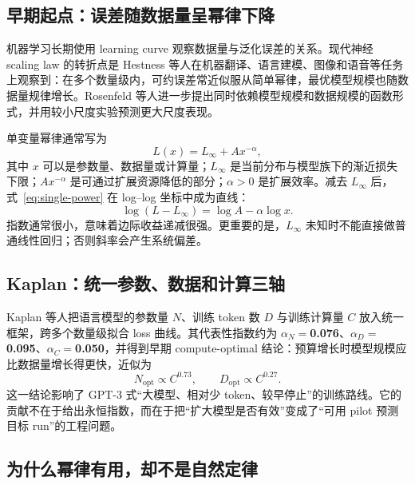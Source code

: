 \documentclass[UTF8,10pt,a4paper,fontset=none]{ctexart}
\begin{document}
\subsection{早期起点：误差随数据量呈幂律下降}

机器学习长期使用 learning curve 观察数据量与泛化误差的关系。现代神经 scaling law 的转折点是 Hestness 等人在机器翻译、语言建模、图像和语音等任务上观察到：在多个数量级内，可约误差常近似服从简单幂律，最优模型规模也随数据量规律增长\cite{hestness2017}。Rosenfeld 等人进一步提出同时依赖模型规模和数据规模的函数形式，并用较小尺度实验预测更大尺度表现\cite{rosenfeld2019}。

单变量幂律通常写为
\begin{equation}
  L(x)=L_{\infty}+A x^{-\alpha},
  \label{eq:single-power}
\end{equation}
其中 $x$ 可以是参数量、数据量或计算量；$L_{\infty}$ 是当前分布与模型族下的渐近损失下限；$A x^{-\alpha}$ 是可通过扩展资源降低的部分；$\alpha>0$ 是扩展效率。减去 $L_{\infty}$ 后，式~\eqref{eq:single-power} 在 log--log 坐标中成为直线：
\begin{equation}
  \log\!\left(L-L_{\infty}\right)=\log A-\alpha\log x.
  \label{eq:loglinear}
\end{equation}
指数通常很小，意味着边际收益递减很强。更重要的是，$L_{\infty}$ 未知时不能直接做普通线性回归；否则斜率会产生系统偏差。

\subsection{Kaplan：统一参数、数据和计算三轴}

Kaplan 等人把语言模型的参数量 $N$、训练 token 数 $D$ 与训练计算量 $C$ 放入统一框架，跨多个数量级拟合 loss 曲线\cite{kaplan2020}。其代表性指数约为 $\alpha_N=$\textbf{0.076}、$\alpha_D=$\textbf{0.095}、$\alpha_C=$\textbf{0.050}，并得到早期 compute-optimal 结论：预算增长时模型规模应比数据量增长得更快，近似为
\begin{equation}
  N_{\mathrm{opt}}\propto C^{0.73},\qquad
  D_{\mathrm{opt}}\propto C^{0.27}.
  \label{eq:kaplan-opt}
\end{equation}
这一结论影响了 GPT-3 式“大模型、相对少 token、较早停止”的训练路线\cite{brown2020}。它的贡献不在于给出永恒指数，而在于把“扩大模型是否有效”变成了“可用 pilot 预测目标 run”的工程问题。

\subsection{为什么幂律有用，却不是自然定律}
\end{document}
